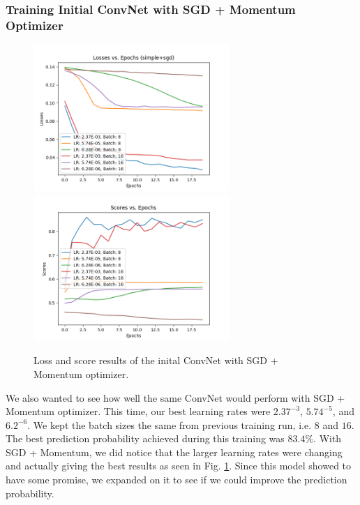 \documentclass[11pt]{ieeeconf}
\begin{document}
\subsubsection{Training Initial ConvNet with SGD + Momentum Optimizer}
\begin{figure}[h]
  \centering
  \includegraphics[width=20em]{simple_sgd_Losses_20e.png}
  \includegraphics[width=20em]{simple_sgd_Scores_20e.png}
  \caption{Loss and score results of the inital ConvNet with SGD + Momentum optimizer.}
  \label{fig:simple_sgd}
\end{figure}

We also wanted to see how well the same ConvNet would perform with SGD + Momentum optimizer. This time, our best learning rates were $2.37^{-3}$, $5.74^{-5}$, and $6.2^{-6}$. We kept the batch sizes the same from previous training run, i.e. ${8}$ and ${16}$. The best prediction probability achieved during this training was $83.4\%$. With SGD + Momentum, we did notice that the larger learning rates were changing and actually giving the best results as seen in Fig. \ref{fig:simple_sgd}. Since this model showed to have some promise, we expanded on it to see if we could improve the prediction probability.
\end{document}
